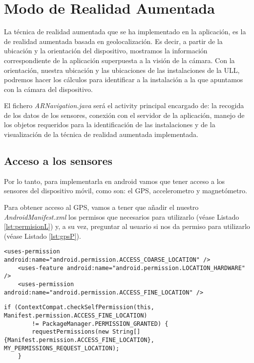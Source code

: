  
 
\section{Modo de Realidad Aumentada}

La técnica de realidad aumentada que se ha implementado en la aplicación, es la de realidad aumentada basada en geolocalización. Es decir, a partir de la ubicación y la orientación del dispositivo, mostramos la información correspondiente de la aplicación superpuesta a la visión de la cámara. Con la orientación, nuestra ubicación y las ubicaciones de las instalaciones de la ULL, podremos hacer los cálculos para identificar a la instalación a la que apuntamos con la cámara del dispositivo.


El fichero \textit{ARNavigation.java} será el activity principal encargado de: la recogida de los datos de los sensores, conexión con el servidor de la aplicación, manejo de los objetos requeridos para la identificación de las instalaciones y de la visualización de la técnica de realidad aumentada implementada.

\subsection{Acceso a los sensores}

Por lo tanto, para implementarla en android vamos que tener acceso a los sensores del dispositivo móvil, como son: el GPS, accelerometro y magnetómetro. 


Para obtener acceso al GPS, vamos a tener que añadir el nuestro \textit{AndroidManifest.xml} los permisos que necesarios para utilizarlo (véase Listado \ref{lst:permisionL}) y, a su vez, preguntar al usuario si nos da permiso para utilizarlo (véase Listado \ref{lst:gpsP}).

\begin{lstlisting}[caption={Fichero \textit{AndroidManifest.xml} del proyecto, permisos para acceder a la ubicación del dispositivo.}, label={lst:permisionL}]
    <uses-permission android:name="android.permission.ACCESS_COARSE_LOCATION" />
    <uses-feature android:name="android.permission.LOCATION_HARDWARE" />
    <uses-permission android:name="android.permission.ACCESS_FINE_LOCATION" />
\end{lstlisting}

\begin{lstlisting}[caption={Código para que el usuario nos conceda permiso para acceder a la ubicacion del dispositivo.}, label={lst:gpsP}]
    if (ContextCompat.checkSelfPermission(this, Manifest.permission.ACCESS_FINE_LOCATION)
        != PackageManager.PERMISSION_GRANTED) {
        requestPermissions(new String[]{Manifest.permission.ACCESS_FINE_LOCATION},                  MY_PERMISSIONS_REQUEST_LOCATION);   
    }
\end{lstlisting}


